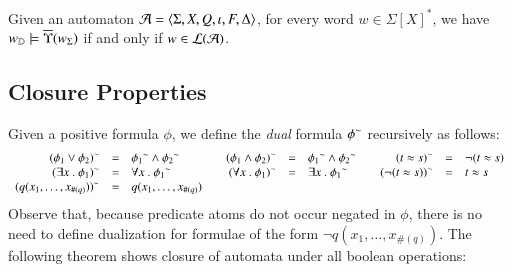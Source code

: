 \documentclass{llncs}
\begin{document}
\begin{lemma}\label{lemma:substitution}
  Given an automaton $\mathcal{A} = \langle \Sigma,X,Q,\iota,F,\Delta \rangle$, for
  every word $w \in \Sigma[X]^*$, we have $w_{\mathbb{D}} \models
  \overline{\Upsilon}({w_\Sigma})$ if and only if $w \in {\mathcal L}({\mathcal{A}})$.
\end{lemma}

\subsection{Closure Properties}

Given a positive formula $\phi$, we define the \emph{dual} formula
${\phi}^{\sim}$ recursively as follows:
\[\begin{array}{rclcrclcrcl}
{(\phi_1 \vee \phi_2)}^{\sim} & = & {\phi_1}^{\sim} \wedge {\phi_2}^{\sim} && 
{(\phi_1 \wedge \phi_2)}^{\sim} & = & {\phi_1}^{\sim} \wedge {\phi_2}^{\sim} &&
{(t \approx s)}^{\sim} & = & \neg(t \approx s) \\
{(\exists x ~.~ \phi_1)}^{\sim} & = & \forall x ~.~ {\phi_1}^{\sim} && 
{(\forall x ~.~ \phi_1)}^{\sim} & = & \exists x ~.~ {\phi_1}^{\sim} && 
{(\neg(t \approx s))}^{\sim} & = & t \approx s \\
{(q(x_1,\ldots,x_{\#(q)}))}^{\sim} & = & q(x_1,\ldots,x_{\#(q)})
\end{array}\]
Observe that, because predicate atoms do not occur negated in $\phi$,
there is no need to define dualization for formulae of the form $\neg
q(x_1,\ldots,x_{\#(q)})$. The following theorem shows closure of
automata under all boolean operations:

\end{document}
